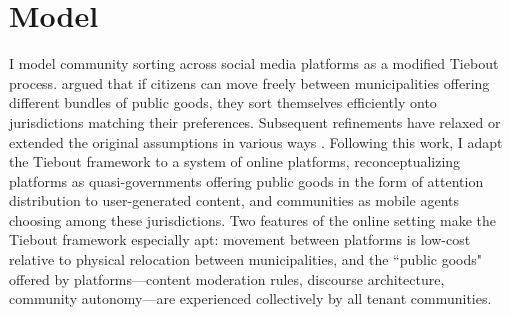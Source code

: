 \documentclass[12pt]{article}
\begin{document}


\section{Model}

I model community sorting across social media platforms as a modified Tiebout process. \cite{tiebout1956pure} argued that if citizens can move freely between municipalities offering different bundles of public goods, they sort themselves efficiently onto jurisdictions matching their preferences. Subsequent refinements have relaxed or extended the original assumptions in various ways \citep{bewley1981critique, wooders1994large, konishi1996voting}. Following this work, I adapt the Tiebout framework to a system of online platforms, reconceptualizing platforms as quasi-governments offering public goods in the form of attention distribution to user-generated content, and communities as mobile agents choosing among these jurisdictions. Two features of the online setting make the Tiebout framework especially apt: movement between platforms is low-cost relative to physical relocation between municipalities, and the ``public goods" offered by platforms---content moderation rules, discourse architecture, community autonomy---are experienced collectively by all tenant communities.
\end{document}
